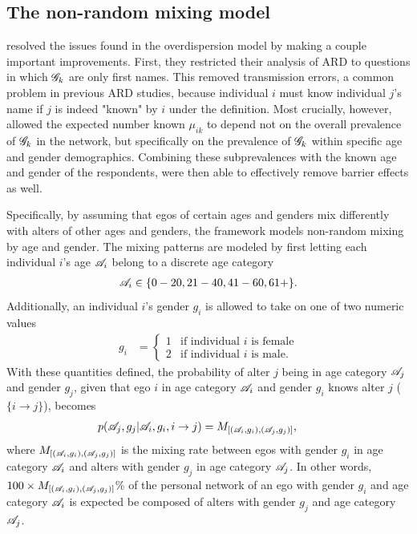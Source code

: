 \subsection{The \citet{McCormick+others:2010} non-random mixing model}
\label{subsec:mixing_matrix}

\citet{McCormick+others:2010} resolved the issues found in the \citet{Zheng+others:2006} overdispersion model by making a couple important improvements. First, they restricted their analysis of ARD to questions in which $\mathcal{G}_k$ are only first names. This removed transmission errors, a common problem in previous ARD studies, because individual $i$ must know individual $j$'s name if $j$ is indeed "known" by $i$ under the \citet{McCarty+others:2001} definition. Most crucially, however, \citet{McCormick+others:2010} allowed the expected number known $\mu_{ik}$ to depend not on the overall prevalence of $\mathcal{G}_k$ in the network, but specifically on the prevalence of $\mathcal{G}_k$ within specific age and gender demographics. Combining these subprevalences with the known age and gender of the respondents, \citet{McCormick+others:2010} were then able to effectively remove barrier effects as well.

Specifically, by assuming that egos of certain ages and genders mix differently with alters of other ages and genders, the \citet{McCormick+others:2010} framework models non-random mixing by age and gender. The mixing patterns are modeled by first letting each individual $i$'s age $\mathcal{A}_i$ belong to a discrete age category
\begin{align}
\mathcal{A}_i \in  \{0-20, 21-40, 41-60, 61+\}. \label{eq:mix_age_cat}
\end{align}
Additionally, an individual $i$'s gender $g_i$ is allowed to take on one of two numeric values
\begin{align}
g_i &= 
\begin{cases}
1 & \text{if individual } i \text{ is female}  \\
2 & \text{if individual } i \text{ is male} .
\end{cases} \label{eq:mix_gender_cat}
\end{align}
With these quantities defined, the probability of alter $j$ being in age category $\mathcal{A}_j$ and gender $g_j$, given that ego $i$ in age category $\mathcal{A}_i$ and gender $g_i$ knows alter $j$ ($\{i \to j\}$), becomes
\begin{align}
p(\mathcal{A}_j, g_j | \mathcal{A}_i, g_i, i \to j)
&= M_{[(\mathcal{A}_i,g_i),(\mathcal{A}_j,g_j)]}, && \label{eq:nonrandom_mixing_matrix}
\end{align}
where $M_{[(\mathcal{A}_i,g_i),(\mathcal{A}_j,g_j)]}$ is the mixing rate between egos with gender $g_i$ in age category $\mathcal{A}_i$ and alters with gender $g_j$ in age category $\mathcal{A}_j$. In other words, $100 \times M_{[(\mathcal{A}_i,g_i),(\mathcal{A}_j,g_j)]}$\% of the personal network of an ego with gender $g_i$ and age category $\mathcal{A}_i$ is expected be composed of alters with gender $g_j$ and age category $\mathcal{A}_j$.

